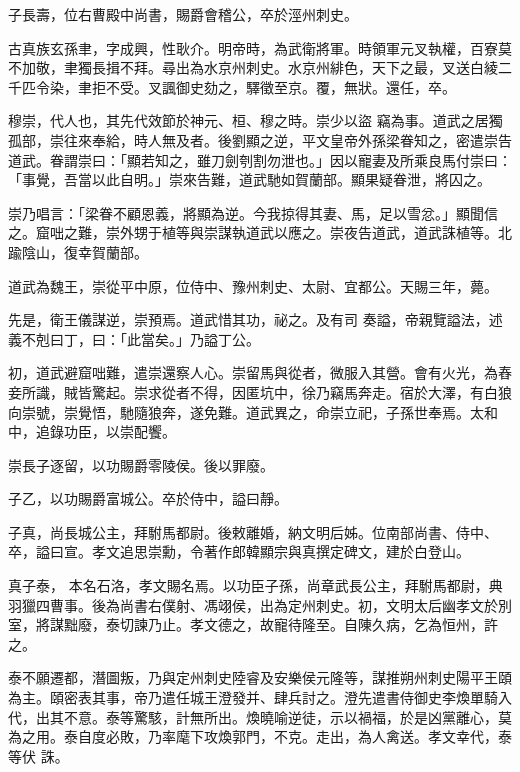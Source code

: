 \begin{pinyinscope}
 子長壽，位右曹殿中尚書，賜爵會稽公，卒於涇州刺史。



 古真族玄孫聿，字成興，性耿介。明帝時，為武衛將軍。時領軍元叉執權，百寮莫不加敬，聿獨長揖不拜。尋出為水京州刺史。水京州緋色，天下之最，叉送白綾二千匹令染，聿拒不受。叉諷御史劾之，驛徵至京。覆，無狀。還任，卒。



 穆崇，代人也，其先代效節於神元、桓、穆之時。崇少以盜
 竊為事。道武之居獨孤部，崇往來奉給，時人無及者。後劉顯之逆，平文皇帝外孫梁眷知之，密遣崇告道武。眷謂崇曰：「顯若知之，雖刀劍刳割勿泄也。」因以寵妻及所乘良馬付崇曰：「事覺，吾當以此自明。」崇來告難，道武馳如賀蘭部。顯果疑眷泄，將囚之。



 崇乃唱言：「梁眷不顧恩義，將顯為逆。今我掠得其妻、馬，足以雪忿。」顯聞信之。窟咄之難，崇外甥于植等與崇謀執道武以應之。崇夜告道武，道武誅植等。北踰陰山，復幸賀蘭部。



 道武為魏王，崇從平中原，位侍中、豫州刺史、太尉、宜都公。天賜三年，薨。



 先是，衛王儀謀逆，崇預焉。道武惜其功，祕之。及有司
 奏謚，帝親覽謚法，述義不剋曰丁，曰：「此當矣。」乃謚丁公。



 初，道武避窟咄難，遣崇還察人心。崇留馬與從者，微服入其營。會有火光，為舂妾所識，賊皆驚起。崇求從者不得，因匿坑中，徐乃竊馬奔走。宿於大澤，有白狼向崇號，崇覺悟，馳隨狼奔，遂免難。道武異之，命崇立祀，子孫世奉焉。太和中，追錄功臣，以崇配饗。



 崇長子逐留，以功賜爵零陵侯。後以罪廢。



 子乙，以功賜爵富城公。卒於侍中，謚曰靜。



 子真，尚長城公主，拜駙馬都尉。後敕離婚，納文明后姊。位南部尚書、侍中、卒，謚曰宣。孝文追思崇勳，令著作郎韓顯宗與真撰定碑文，建於白登山。



 真子泰，
 本名石洛，孝文賜名焉。以功臣子孫，尚章武長公主，拜駙馬都尉，典羽獵四曹事。後為尚書右僕射、馮翊侯，出為定州刺史。初，文明太后幽孝文於別室，將謀黜廢，泰切諫乃止。孝文德之，故寵待隆至。自陳久病，乞為恒州，許之。



 泰不願遷都，潛圖叛，乃與定州刺史陸睿及安樂侯元隆等，謀推朔州刺史陽平王頤為主。頤密表其事，帝乃遣任城王澄發并、肆兵討之。澄先遣書侍御史李煥單騎入代，出其不意。泰等驚駭，計無所出。煥曉喻逆徒，示以禍福，於是凶黨離心，莫為之用。泰自度必敗，乃率麾下攻煥郭門，不克。走出，為人禽送。孝文幸代，泰等伏
 誅。




\end{pinyinscope}
